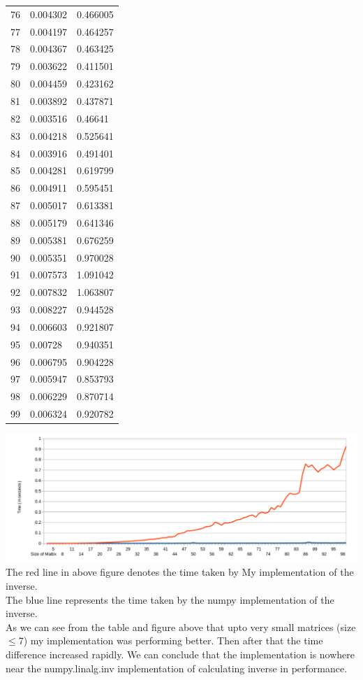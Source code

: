 \documentclass[runningheads]{llncs}
\begin{document}
\begin{longtable}{| p{} | p{} | p{} |}
76 & 0.004302 & 0.466005 \\
77 & 0.004197 & 0.464257 \\
78 & 0.004367 & 0.463425 \\
79 & 0.003622 & 0.411501 \\
80 & 0.004459 & 0.423162 \\
81 & 0.003892 & 0.437871 \\
82 & 0.003516 & 0.46641 \\
83 & 0.004218 & 0.525641 \\
84 & 0.003916 & 0.491401 \\
85 & 0.004281 & 0.619799 \\
86 & 0.004911 & 0.595451 \\
87 & 0.005017 & 0.613381 \\
88 & 0.005179 & 0.641346 \\
89 & 0.005381 & 0.676259 \\
90 & 0.005351 & 0.970028 \\
91 & 0.007573 & 1.091042 \\
92 & 0.007832 & 1.063807 \\
93 & 0.008227 & 0.944528 \\
94 & 0.006603 & 0.921807 \\
95 & 0.00728 & 0.940351 \\
96 & 0.006795 & 0.904228 \\
97 & 0.005947 & 0.853793 \\
98 & 0.006229 & 0.870714 \\
99 & 0.006324 & 0.920782 \\
\hline
\end{longtable}
\includegraphics[scale=0.8]{profiling}
The red line in above figure denotes the time taken by My implementation of the inverse.\\
The blue line represents the time taken by the numpy implementation of the inverse.\\

As we can see from the table and figure above that upto very small matrices (size $\leq$7) my implementation was performing better. Then after that the time difference increased rapidly. We can conclude that the implementation is nowhere near the numpy.linalg.inv implementation of calculating inverse in performance. 
\end{document}
